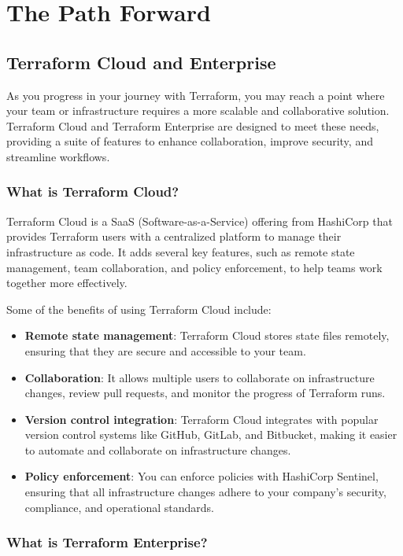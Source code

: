 \chapter{The Path Forward}
\sloppy

\section{Terraform Cloud and Enterprise}

As you progress in your journey with Terraform, you may reach a point where your team or infrastructure requires a more scalable and collaborative solution. Terraform Cloud and Terraform Enterprise are designed to meet these needs, providing a suite of features to enhance collaboration, improve security, and streamline workflows.

\subsection{What is Terraform Cloud?}

Terraform Cloud is a SaaS (Software-as-a-Service) offering from HashiCorp that provides Terraform users with a centralized platform to manage their infrastructure as code. It adds several key features, such as remote state management, team collaboration, and policy enforcement, to help teams work together more effectively.

Some of the benefits of using Terraform Cloud include:

\begin{itemize}
  \item \textbf{Remote state management}: Terraform Cloud stores state files remotely, ensuring that they are secure and accessible to your team.
  \item \textbf{Collaboration}: It allows multiple users to collaborate on infrastructure changes, review pull requests, and monitor the progress of Terraform runs.
  \item \textbf{Version control integration}: Terraform Cloud integrates with popular version control systems like GitHub, GitLab, and Bitbucket, making it easier to automate and collaborate on infrastructure changes.
  \item \textbf{Policy enforcement}: You can enforce policies with HashiCorp Sentinel, ensuring that all infrastructure changes adhere to your company's security, compliance, and operational standards.
\end{itemize}

\subsection{What is Terraform Enterprise?}

